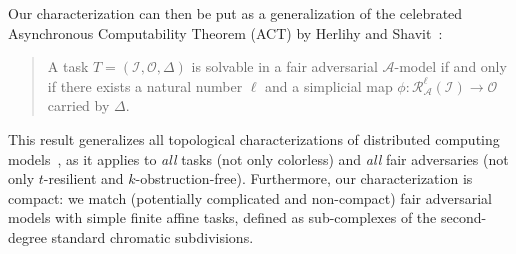 \documentclass[a4paper]{article}
\newcommand{\myparagraph}[1]{\vspace{6pt}\noindent \textbf{#1}}
\newcommand{\remove}[1]{}
\newcommand{\ignore}[1]{}
\def\A{\ensuremath{\mathcal{A}}}
\def\R{\ensuremath{\mathcal{R}}}
\def\I{\ensuremath{\mathcal{I}}}
\def\O{\ensuremath{\mathcal{O}}}
\def\fair{\textit{fair}}
\def\O {\mathcal{O}}
\def\I {\mathcal{I}}
\begin{document}

%
\remove{ 
Our characterization is expressed in an abstract way via
\emph{agreement functions}~\cite{KR17}.
%
For each set of \emph{participating} processes (i.e., processes that
took at least one step in the
computation), the agreement function determines the best level of set
consensus that can be achieved if only these processes \emph{participate} in
the computation.
%
The agreement function corresponding to any adversary can be efficiently computed for
any adversary~\cite{GK10,KR17}.
It turns out that agreement functions encode enough information to
characterize the task computability of any {\fair}
adversary~\cite{KR17}.
}
%

\ignore{
Symmetric adversaries (or \emph{symmetric progress
  conditions} introduced by Taubenfeld. 
%
A symmetric adversary does not depend on process identifiers: if
$S\in\A$, then for every set of processes $S'$ such that $|S'|=|S|$,
we have $S'\in\A$.
%
Thus, an $n$-process symmetric adversary can be defined
as a set $L$ of ``levels'' in
$\{1,\ldots,n\}$ so that a set of processes is a live set if and only
if its size is in $L$.
%
For example, the \emph{$k$-obstruction free} adversary, recently
characterized in an affine way in~\cite{GHKR16}, consists of all
sets of  sizes from $1$ to $k$.
}

Our characterization can then be put as a generalization of the
celebrated Asynchronous Computability Theorem (ACT) by Herlihy and Shavit~\cite{HS99}:
\begin{quote}
A task $T=(\I,\O,\Delta)$ is solvable in a fair adversarial $\A$-model
if and only if there exists a natural number $\ell$ and a simplicial map
$\phi: \R_{\A}^{\ell}(\I) \rightarrow \O$ carried by $\Delta$.
\end{quote}

This result generalizes all topological characterizations of
distributed computing models~\cite{HS99,GKM14-podc,GHKR16,SHG16},
as it applies to \emph{all} tasks (not only colorless)
and \emph{all} fair adversaries (not only
$t$-resilient and $k$-obstruction-free).
Furthermore, our characterization is compact: we match (potentially complicated and non-compact)
fair adversarial models with simple finite affine tasks, defined as 
sub-complexes of the second-degree standard chromatic subdivisions.
\end{document}
